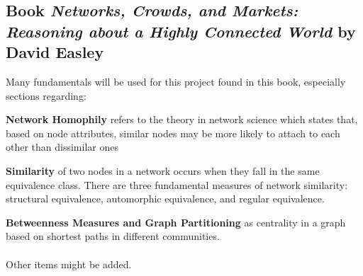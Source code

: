 \documentclass[12pt,a4paper]{report}
\begin{document}
\subsection{Book \emph{Networks, Crowds, and Markets: Reasoning about a Highly Connected World} by David Easley} Many fundamentals will be used for this project found in this book, especially sections regarding:
\begin{list}{•}{}
\item \textbf{Network Homophily} refers to the theory in network science which states that, based on node attributes, similar nodes may be more likely to attach to each other than dissimilar ones
\item \textbf{Similarity} of two nodes in a network occurs when they fall in the same equivalence class. There are three fundamental measures of network similarity: structural equivalence, automorphic equivalence, and regular equivalence.
\item \textbf{Betweenness Measures and Graph Partitioning} as  centrality in a graph based on shortest paths in different communities.
\end{list}

\paragraph{} Other items might be added.

%
\end{document}

